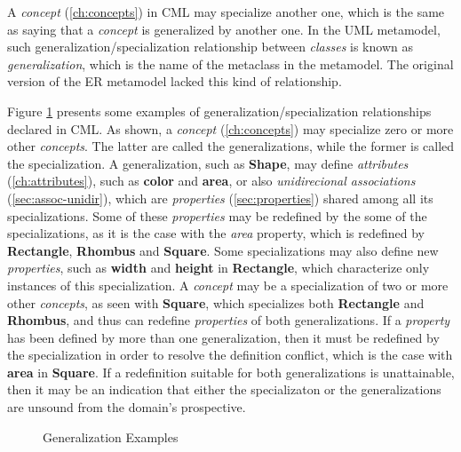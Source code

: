 \begin{definition}
A \emph{concept} (\ref{ch:concepts}) in CML may specialize another one,
which is the same as saying that a \emph{concept} is generalized by another one.
In the UML \cite{uml} metamodel,
such generalization/specialization relationship between \emph{classes}
is known as \emph{generalization}, which is the name of the metaclass in the metamodel.
The original version of the ER \cite{er} metamodel lacked this kind of relationship.
\end{definition}

\begin{examples}
Figure \ref{fig:ex:generalization} presents some examples of
generalization/specialization relationships declared in CML.
As shown,
a \emph{concept} (\ref{ch:concepts}) may specialize zero or more other \emph{concepts}.
The latter are called the generalizations,
while the former is called the specialization.
A generalization, such as \textbf{Shape},
may define \emph{attributes} (\ref{ch:attributes}),
such as \textbf{color} and \textbf{area},
or also \emph{unidirecional associations} (\ref{sec:assoc-unidir}),
which are \emph{properties} (\ref{sec:properties}) shared among all its specializations.
Some of these \emph{properties} may be redefined by the some of the specializations,
as it is the case with the \emph{area} property,
which is redefined by \textbf{Rectangle}, \textbf{Rhombus} and \textbf{Square}.
Some specializations may also define new \emph{properties},
such as \textbf{width} and \textbf{height} in \textbf{Rectangle},
which characterize only instances of this specialization.
A \emph{concept} may be a specialization of two or more other \emph{concepts},
as seen with \textbf{Square},
which specializes both \textbf{Rectangle} and \textbf{Rhombus},
and thus can redefine \emph{properties} of both generalizations.
If a \emph{property} has been defined by more than one generalization,
then it must be redefined by the specialization
in order to resolve the definition conflict,
which is the case with \textbf{area} in \textbf{Square}. 
If a redefinition suitable for both generalizations is unattainable,
then it may be an indication that either the specializaton or the generalizations
are unsound from the domain's prospective.
\end{examples}

\begin{figure}
\verbatimfont{\small}

\caption{Generalization Examples}
\label{fig:ex:generalization}
\end{figure}
